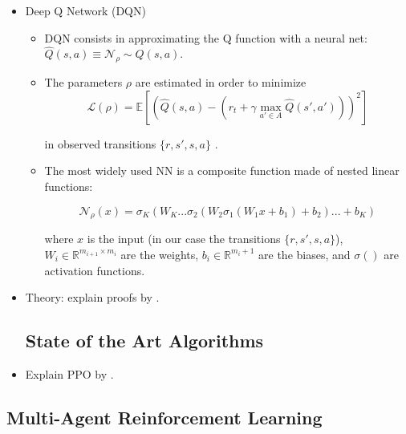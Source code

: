 \documentclass[11pt,english]{article}
\newcommand{\E}{\mathbb{E}}
\begin{document}
\begin{itemize}
	\item Deep Q Network (DQN)
	\begin{itemize}
		\item DQN consists in approximating the Q function with a neural net: $\hat{Q}(s,a) \equiv  \mathcal{N}_\rho \sim Q(s,a)$.\medskip
		\item The parameters $\rho$ are estimated in order to minimize\medskip
		$$\mathcal{L}(\rho)=\E \left[ \left(\hat{Q}(s,a)-(r_t+\gamma \max_{a' \in A} \hat{Q}(s',a')) \right)^2 \right] $$
		
		in observed transitions $\{r, s'  ,s, a\}$ .\medskip
		
		\item The most widely used NN is a composite function made of nested linear functions:  \medskip
		
		$$\mathcal{N}_\rho (x)=\sigma_K(W_K ... \sigma_2(W_2 \sigma_1(W_1x+b_1)+b_2)...+b_K)$$
		
		where $x$ is the input (in our case the transitions $\{r, s'  ,s, a\}$), $W_i \in \mathbb{R}^{m_{i+1}\times m_i}$ are the weights, $b_i \in \mathbb{R}^{m_i+1}$ are the biases, and $\sigma()$ are activation functions.
	\end{itemize}

	\item Theory: explain proofs by \citet{maei2009}.

\subsection{State of the Art Algorithms}

	\item Explain PPO by \citet{schulman2017}.
\end{itemize}

\subsection{Multi-Agent Reinforcement Learning}
\end{document}
